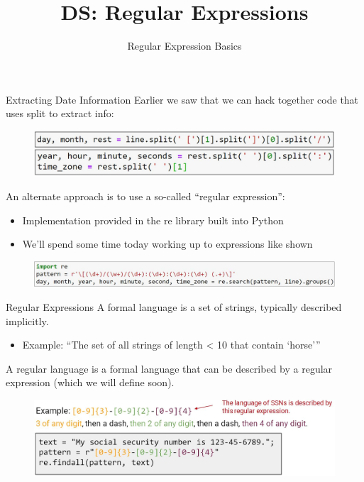 \documentclass[aspectratio=169]{../latex_main/tntbeamer}  %
\title[Introduction]{DS: Regular Expressions}
\subtitle{Regular Expression Basics}
\begin{document}
	
	\maketitle
	\begin{frame}{Extracting Date Information}
	    Earlier we saw that we can hack together code that uses split to extract info:\\
	    \begin{figure}
	        \centering
	        \includegraphics[scale=.35]{Bild6}
	    \end{figure}
	    An alternate approach is to use a so-called “regular expression”:
        \begin{itemize}
            \item Implementation provided in the re library built into Python
            \item We’ll spend some time today working up to expressions like shown 
        \end{itemize}
        \begin{figure}
	        \centering
	        \includegraphics[scale=.6]{Bild7}
	    \end{figure}
	\end{frame}
	
	
	
	
	\begin{frame}{Regular Expressions}
	    A formal language is a set of strings, typically described implicitly.
	    \begin{itemize}
	        \item Example: “The set of all strings of length < 10 that contain ‘horse’”
	    \end{itemize}
	    A regular language is a formal language that can be described by a regular expression (which we will define soon). 
        \begin{figure}
	        \centering
	        \includegraphics[scale=.44]{Bild8}
	    \end{figure}
	\end{frame}
	
\end{document}
